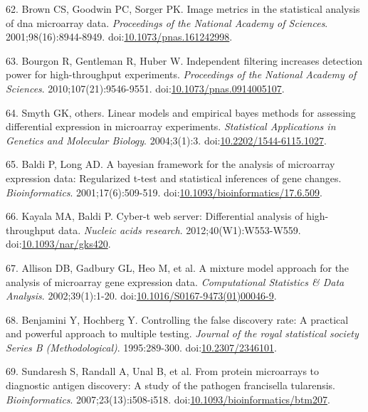 \documentclass[]{article}
\begin{document}
\hypertarget{ref-brown2001image}{}
62. Brown CS, Goodwin PC, Sorger PK. Image metrics in the statistical
analysis of dna microarray data. \emph{Proceedings of the National
Academy of Sciences}. 2001;98(16):8944-8949.
doi:\href{https://doi.org/10.1073/pnas.161242998}{10.1073/pnas.161242998}.

\hypertarget{ref-bourgon2010filter}{}
63. Bourgon R, Gentleman R, Huber W. Independent filtering increases
detection power for high-throughput experiments. \emph{Proceedings of
the National Academy of Sciences}. 2010;107(21):9546-9551.
doi:\href{https://doi.org/10.1073/pnas.0914005107}{10.1073/pnas.0914005107}.

\hypertarget{ref-smyth2004ebayes}{}
64. Smyth GK, others. Linear models and empirical bayes methods for
assessing differential expression in microarray experiments.
\emph{Statistical Applications in Genetics and Molecular Biology}.
2004;3(1):3.
doi:\href{https://doi.org/10.2202/1544-6115.1027}{10.2202/1544-6115.1027}.

\hypertarget{ref-baldi2001cybert}{}
65. Baldi P, Long AD. A bayesian framework for the analysis of
microarray expression data: Regularized t-test and statistical
inferences of gene changes. \emph{Bioinformatics}. 2001;17(6):509-519.
doi:\href{https://doi.org/10.1093/bioinformatics/17.6.509}{10.1093/bioinformatics/17.6.509}.

\hypertarget{ref-kayala2012cyber}{}
66. Kayala MA, Baldi P. Cyber-t web server: Differential analysis of
high-throughput data. \emph{Nucleic acids research}.
2012;40(W1):W553-W559.
doi:\href{https://doi.org/10.1093/nar/gks420}{10.1093/nar/gks420}.

\hypertarget{ref-allison2002mmm}{}
67. Allison DB, Gadbury GL, Heo M, et al. A mixture model approach for
the analysis of microarray gene expression data. \emph{Computational
Statistics \& Data Analysis}. 2002;39(1):1-20.
doi:\href{https://doi.org/10.1016/S0167-9473(01)00046-9}{10.1016/S0167-9473(01)00046-9}.

\hypertarget{ref-benjamini1995fdr}{}
68. Benjamini Y, Hochberg Y. Controlling the false discovery rate: A
practical and powerful approach to multiple testing. \emph{Journal of
the royal statistical society Series B (Methodological)}. 1995:289-300.
doi:\href{https://doi.org/10.2307/2346101}{10.2307/2346101}.

\hypertarget{ref-sundaresh2007}{}
69. Sundaresh S, Randall A, Unal B, et al. From protein microarrays to
diagnostic antigen discovery: A study of the pathogen francisella
tularensis. \emph{Bioinformatics}. 2007;23(13):i508-i518.
doi:\href{https://doi.org/10.1093/bioinformatics/btm207}{10.1093/bioinformatics/btm207}.
\end{document}
